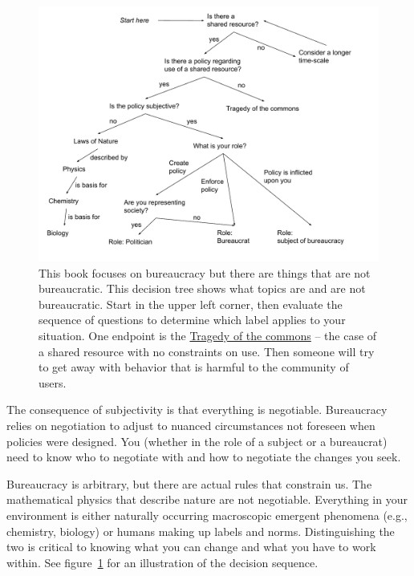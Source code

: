 \begin{figure}
    \centering
    \includegraphics[width=1.05\textwidth]{images/am_I_a_bureaucrat.pdf}
    \caption{This book focuses on bureaucracy but there are things that are not bureaucratic.     
    This decision tree shows what topics are and are not bureaucratic. Start in the upper left corner, then evaluate the sequence of questions to determine which label applies to your situation.
    One endpoint is the \href{https://en.wikipedia.org/wiki/Tragedy_of_the_commons}{Tragedy of the commons}  
    -- the case of a shared resource with no constraints on use. Then someone will try to get away with behavior that is harmful to the community of users.}
    \label{fig:am-I-a-bureaucrat}
\end{figure}

The consequence of subjectivity is that everything is negotiable. Bureaucracy relies on negotiation to adjust to nuanced circumstances not foreseen when policies were designed.  You (whether in the role of a subject or a bureaucrat) need to know who to negotiate with and how to negotiate the changes you seek. 

Bureaucracy is arbitrary, but there are actual rules that constrain us. The mathematical physics that describe nature are not negotiable. Everything in your environment is either naturally occurring macroscopic emergent phenomena (e.g., chemistry, biology) or humans making up labels and norms. Distinguishing the two is critical to knowing what you can change and what you have to work within. See figure~\ref{fig:am-I-a-bureaucrat}\iftoggle{haspagenumbers}{ on page~\pageref{fig:am-I-a-bureaucrat}}{} for an illustration of the decision sequence.

